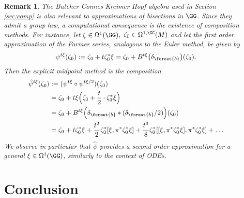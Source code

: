 \documentclass[a4paper,11pt]{article}
\newtheorem{remark}[theorem]{Remark}
\begin{document}
\begin{remark}
The Butcher-Connes-Kreimer Hopf algebra used in Section \ref{sec:comp} is also relevant to approximations of bisections in $\GG$. Since they admit a group law, a computational consequence is the existence of composition methods.
For instance, let $\xi \in \Omega^1(\GG),$ $\zeta_0 \in \Omega^{1, \GG}(M)$ and let the first order approximation of the Farmer series, analogous to the Euler method, be given by
\[
\psi^{t\xi}(\zeta_0):=\zeta_0+t\zeta_0^* \xi= \zeta_0 + B^{t\xi}\bigl(\delta_{\forest{b}}\bigr)(\zeta_0).
\]
Then the explicit midpoint method is the composition
\begin{align*}
\hat{\psi}^{t\xi}(\zeta_0)&:= (\psi^{t\xi}\circ \psi^{t\xi/2})(\zeta_0)\\
&=\zeta_0+t \xi\Bigl(\zeta_0+\frac{t}{2} \cdot \zeta_0^*\xi \Bigr)\\
&=\zeta_0+B^{t\xi}\Bigl(\delta_{\forest{b}}* (\delta_{\forest{b}}/2)\Bigr)(\zeta_0)\\
&=\zeta_0 + t \zeta_0^*\xi 
+ \frac{t^2}{2}\zeta_0^*[ \xi, \pi^* \zeta_0^* \xi ]
+ \frac{t^3}{8}\zeta_0^*[[ \xi, \pi^* \zeta_0^* \xi ], \pi^* \zeta_0^* \xi]
+\dots
\end{align*}
We observe in particular that $\hat{\psi}$ provides a second order approximation for a general $\xi \in \Omega^1(\GG)$, similarly to the context of ODEs.
\end{remark}







































\section{Conclusion}
\end{document}
